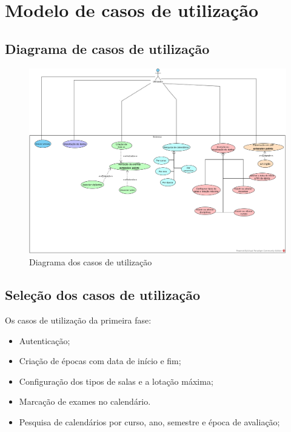 \documentclass[11pt, twoside]{report}
\begin{document}
	
	\chapter{Modelo de casos de utilização}
	\section{Diagrama de casos de utilização}
	
\clearpage
\begin{landscape}
	\pagestyle{empty}
	
		\begin{figure}[H] 
			\centering 			\includegraphics[width=1.3\textwidth,height=1.3\textheight,keepaspectratio]{image/diagrama}
			\caption{Diagrama dos casos de utilização}
		
		\end{figure}
\end{landscape}


	\section{Seleção dos casos de utilização}
	\label{selecaocasosdeuso}
	Os casos de utilização da primeira fase:
	
	\begin{itemize}
		\item Autenticação;
	 	\item Criação de épocas com data de início e fim;
	 	\item Configuração dos tipos de salas e a lotação máxima;
	 	\item Marcação de exames no calendário.
	 	\item Pesquisa de calendários por curso, ano, semestre e época de avaliação;
	\end{itemize}
	
\end{document}

